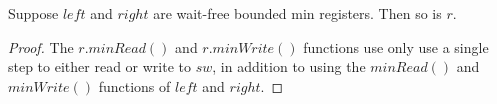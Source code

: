 \documentclass{beamer}
\begin{document}
\begin{frame}
	\begin{lemma}
	Suppose $left$ and $right$ are wait-free bounded min registers. Then so is $r$.
	\end{lemma}
	\begin{proof}
		The $r.minRead()$ and $r.minWrite()$ functions use only use a single step to either read or write to $sw$, in addition to using 
		the $minRead()$ and $minWrite()$ functions of $left$ and $right$. 
	\end{proof}
\end{frame}
\begin{comment}
\begin{frame}
	\begin{lemma}
		Suppose $left$ and $right$ are linearizable bounded min registers. Then so is $r$.
	\end{lemma}
	\begin{proof}
		Consider an execution in which every instance of $r.minRead()$ and $r.minWrite(v)$ instance
		is allowed to complete.\footnote{Given an incomplete execution $e$, since $r$ is wait-free, we can
		append an extension to allow incomplete instances to finish}

		\begin{itemize}
		\item Let $C_{right}$ be the set of $r.readMin()$ instances that read 1 from $sw$ and 
		$r.writeMin(v)$ ops that read 1 from $sw$ where $v > left.size$.
		\item Let $C_{left}$ be the set of $r.readMin()$ instances that read 0 from $sw$ and 
		$r.writeMin{v}$ ops with $v \le left.size$, and thus write $0$ to $sw$. 
		\item Let $C_{switch}$ be the set of $r.writeMin(v)$ that read 0 from $sw$ where $v > left.size$.
		\end{itemize}
	\end{proof}
\end{frame}


\end{comment}
\end{document}
